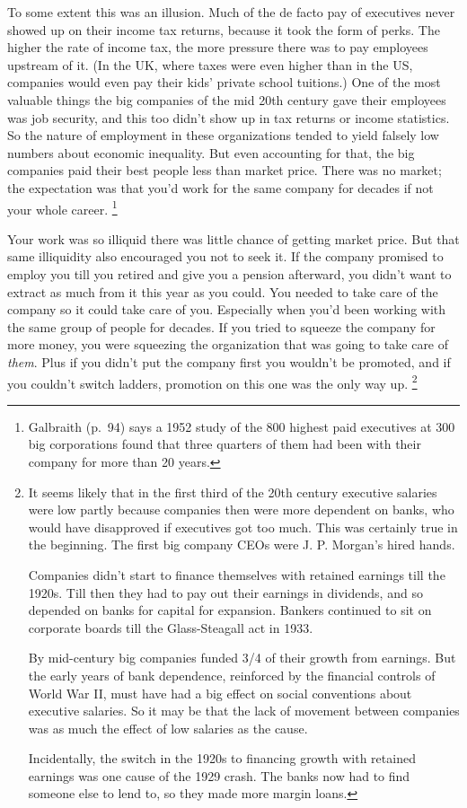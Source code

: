 \documentclass[12pt]{book}
\begin{document}
To some extent this was an illusion. Much of the de facto pay of
executives never showed up on their income tax returns, because it took
the form of perks. The higher the rate of income tax, the more pressure
there was to pay employees upstream of it. (In the UK, where taxes were
even higher than in the US, companies would even pay their kids' private
school tuitions.) One of the most valuable things the big companies of
the mid 20th century gave their employees was job security, and this too
didn't show up in tax returns or income statistics. So the nature of
employment in these organizations tended to yield falsely low numbers
about economic inequality. But even accounting for that, the big
companies paid their best people less than market price. There was no
market; the expectation was that you'd work for the same company for
decades if not your whole career. \footnote{Galbraith (p.~94) says a 1952 study of the 800 highest paid
executives at 300 big corporations found that three quarters of them had
been with their company for more than 20 years.}

Your work was so illiquid there was little chance of getting market
price. But that same illiquidity also encouraged you not to seek it. If
the company promised to employ you till you retired and give you a
pension afterward, you didn't want to extract as much from it this year
as you could. You needed to take care of the company so it could take
care of you. Especially when you'd been working with the same group of
people for decades. If you tried to squeeze the company for more money,
you were squeezing the organization that was going to take care of
\emph{them}. Plus if you didn't put the company first you wouldn't be
promoted, and if you couldn't switch ladders, promotion on this one was
the only way up. \footnote{It seems likely that in the first third of the 20th century
executive salaries were low partly because companies then were more
dependent on banks, who would have disapproved if executives got too
much. This was certainly true in the beginning. The first big company
CEOs were J. P. Morgan's hired hands.

Companies didn't start to finance themselves with retained earnings till
the 1920s. Till then they had to pay out their earnings in dividends,
and so depended on banks for capital for expansion. Bankers continued to
sit on corporate boards till the Glass-Steagall act in 1933.

By mid-century big companies funded 3/4 of their growth from earnings.
But the early years of bank dependence, reinforced by the financial
controls of World War II, must have had a big effect on social
conventions about executive salaries. So it may be that the lack of
movement between companies was as much the effect of low salaries as the
cause.

Incidentally, the switch in the 1920s to financing growth with retained
earnings was one cause of the 1929 crash. The banks now had to find
someone else to lend to, so they made more margin loans.}
\end{document}
